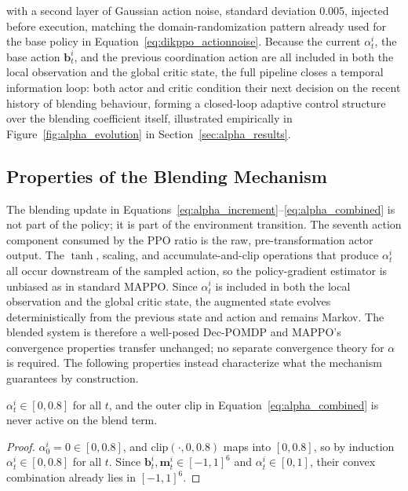 with a second layer of Gaussian action noise, standard deviation 0.005, injected before execution,
matching the domain-randomization pattern already used for the base policy in
Equation~\eqref{eq:dikppo_actionnoise}. Because the current $\alpha_t^i$, the base action
$\mathbf{b}_t^i$, and the previous coordination action are all included in both the local
observation and the global critic state, the full pipeline closes a temporal information loop: both
actor and critic condition their next decision on the recent history of blending behaviour, forming
a closed-loop adaptive control structure over the blending coefficient itself, illustrated
empirically in Figure~\ref{fig:alpha_evolution} in Section~\ref{sec:alpha_results}.


\subsection{Properties of the Blending Mechanism}\label{sec:alpha_properties}

The blending update in Equations~\eqref{eq:alpha_increment}--\eqref{eq:alpha_combined} is not part of
the policy; it is part of the environment transition. The seventh action component consumed by the
PPO ratio is the raw, pre-transformation actor output. The $\tanh$, scaling, and accumulate-and-clip
operations that produce $\alpha_t^i$ all occur downstream of the sampled action, so the
policy-gradient estimator is unbiased as in standard MAPPO. Since $\alpha_t^i$ is included in both the
local observation and the global critic state, the augmented state evolves deterministically from the
previous state and action and remains Markov. The blended system is therefore a well-posed Dec-POMDP
and MAPPO's convergence properties transfer unchanged; no separate convergence theory for $\alpha$ is
required. The following properties instead characterize what the mechanism guarantees by
construction.

\begin{proposition}[Invariance]\label{prop:invariance}
$\alpha_t^i \in [0, 0.8]$ for all $t$, and the outer clip in Equation~\eqref{eq:alpha_combined} is never
active on the blend term.
\end{proposition}
\begin{proof}
$\alpha_0^i = 0 \in [0,0.8]$, and $\mathrm{clip}(\cdot, 0, 0.8)$ maps into $[0,0.8]$, so by induction
$\alpha_t^i \in [0,0.8]$ for all $t$. Since $\mathbf{b}_t^i, \mathbf{m}_t^i \in [-1,1]^6$ and
$\alpha_t^i \in [0,1]$, their convex combination already lies in $[-1,1]^6$.
\end{proof}

